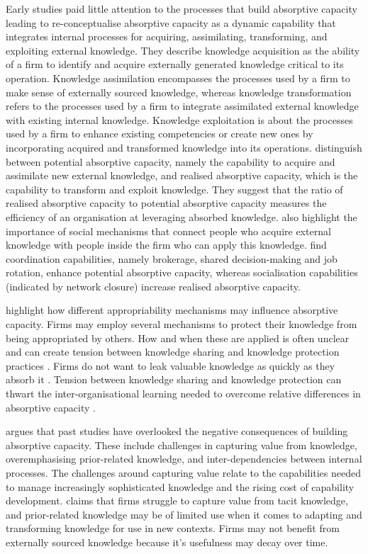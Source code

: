 Early studies paid little attention to the processes that build absorptive capacity leading \citet{zahra2002absorptive} to re-conceptualise absorptive capacity as a dynamic capability that integrates internal processes for acquiring, assimilating, transforming, and exploiting external knowledge. They describe knowledge acquisition as the ability of a firm to identify and acquire externally generated knowledge critical to its operation. Knowledge assimilation encompasses the processes used by a firm to make sense of externally sourced knowledge, whereas knowledge transformation refers to the processes used by a firm to integrate assimilated external knowledge with existing internal knowledge. Knowledge exploitation is about the processes used by a firm to enhance existing competencies or create new ones by incorporating acquired and transformed knowledge into its operations. \citet{zahra2002absorptive} distinguish between potential absorptive capacity, namely the capability to acquire and assimilate new external knowledge, and realised absorptive capacity, which is the capability to transform and exploit knowledge. They suggest that the ratio of realised absorptive capacity to potential absorptive capacity measures the efficiency of an organisation at leveraging absorbed knowledge. \citet{zahra2002absorptive} also highlight the importance of social mechanisms that connect people who acquire external knowledge with people inside the firm who can apply this knowledge. \citet{jansen2005managing} find coordination capabilities, namely brokerage, shared decision-making and job rotation, enhance potential absorptive capacity, whereas socialisation capabilities (indicated by network closure) increase realised absorptive capacity. \medskip

\citet{todorova2007absorptive} highlight how different appropriability mechanisms may influence absorptive capacity. Firms may employ several mechanisms to protect their knowledge from being appropriated by others. How and when these are applied is often unclear and can create tension between knowledge sharing and knowledge protection practices \citep{gama2019managing}. Firms do not want to leak valuable knowledge as quickly as they absorb it \citep{todorova2007absorptive}. Tension between knowledge sharing and knowledge protection can thwart the inter-organisational learning needed to overcome relative differences in absorptive capacity \citep{dragsdahl2019perspective,gama2019managing}. \medskip

\citet {lichtenthaler2016absorptive} argues that past studies have overlooked the negative consequences of building absorptive capacity. These include challenges in capturing value from knowledge, overemphasising prior-related knowledge, and inter-dependencies between internal processes. The challenges around capturing value relate to the capabilities needed to manage increasingly sophisticated knowledge and the rising cost of capability development. \citet{lichtenthaler2016absorptive} claims that firms struggle to capture value from tacit knowledge, and prior-related knowledge may be of limited use when it comes to adapting and transforming knowledge for use in new contexts. Firms may not benefit from externally sourced knowledge because it's usefulness may decay over time. \medskip

